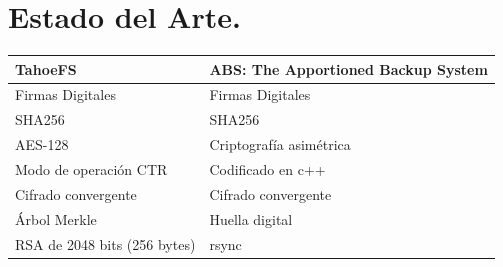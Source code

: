 
\section{Estado del Arte. }
\begin{tabular}{ |p{8cm}|p{8cm}| }
\hline
{ \textbf{TahoeFS}}  & {\textbf{ABS: The Apportioned Backup System} } \\
\hline
{Firmas Digitales}  & {Firmas Digitales} \\
\hline
{SHA256}  & {SHA256}  \\
\hline
{AES-128}  & {Criptografía asimétrica}  \\
\hline
{Modo de operación CTR }  & {Codificado en c++} \\
\hline
{Cifrado convergente}  & {Cifrado convergente}  \\
\hline
{Árbol Merkle}  & {Huella digital} \\
\hline
{RSA de 2048 bits (256 bytes) }  & { rsync  } \\
\hline
\end{tabular}
\\
